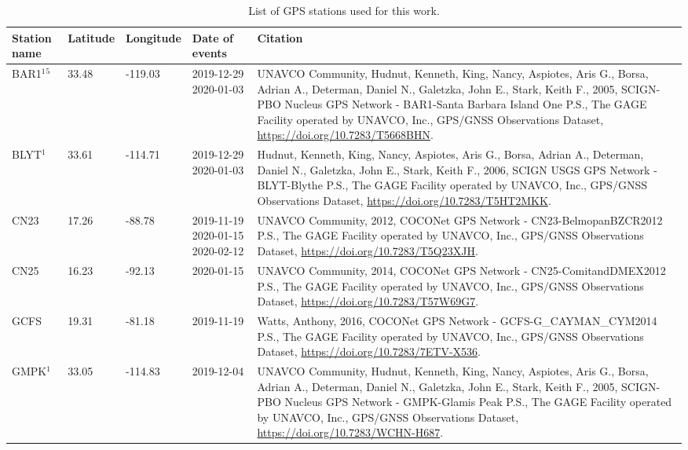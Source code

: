 \clearpage
\onecolumn
\begin{landscape}
  \begin{longtable}{lllp{4cm}p{10cm}}
      \caption{List of GPS stations used for this work.}
      \label{tab:table-stations}
      \endfirsthead
      \endhead
    \hline
    Station name & Latitude & Longitude & Date of events  & Citation \\\hline
    BAR1\hyperlink{Hudnut}{${}^1$}\hyperlink{Hudnut2}{${}^5$}& 33.48 & -119.03 & 2019-12-29 2020-01-03 & UNAVCO Community, Hudnut, Kenneth, King, Nancy, Aspiotes, Aris G., Borsa, Adrian A., Determan, Daniel N., Galetzka, John E., Stark, Keith F., 2005, SCIGN-PBO Nucleus GPS Network - BAR1-Santa Barbara Island One P.S., The GAGE Facility operated by UNAVCO, Inc., GPS/GNSS Observations Dataset, \url{https://doi.org/10.7283/T5668BHN}.\\
    BLYT\hyperlink{Hudnut}{${}^1$} & 33.61 & -114.71 & 2019-12-29 2020-01-03 & Hudnut, Kenneth, King, Nancy, Aspiotes, Aris G., Borsa, Adrian A., Determan, Daniel N., Galetzka, John E., Stark, Keith F., 2006, SCIGN USGS GPS Network - BLYT-Blythe P.S., The GAGE Facility operated by UNAVCO, Inc., GPS/GNSS Observations Dataset, \url{https://doi.org/10.7283/T5HT2MKK}.\\
    CN23 & 17.26 & -88.78 & 2019-11-19 2020-01-15 2020-02-12& UNAVCO Community, 2012, COCONet GPS Network - CN23-BelmopanBZCR2012 P.S., The GAGE Facility operated by UNAVCO, Inc., GPS/GNSS Observations Dataset, \url{https://doi.org/10.7283/T5Q23XJH}.\\
    CN25 & 16.23 & -92.13 & 2020-01-15 & UNAVCO Community, 2014, COCONet GPS Network - CN25-ComitandDMEX2012 P.S., The GAGE Facility operated by UNAVCO, Inc., GPS/GNSS Observations Dataset, \url{https://doi.org/10.7283/T57W69G7}.\\
    GCFS & 19.31 & -81.18 & 2019-11-19& Watts, Anthony, 2016, COCONet GPS Network - GCFS-G\_CAYMAN\_CYM2014 P.S., The GAGE Facility operated by UNAVCO, Inc., GPS/GNSS Observations Dataset, \url{https://doi.org/10.7283/7ETV-X536}.\\
    GMPK\hyperlink{Hudnut}{${}^1$} & 33.05 & -114.83 & 2019-12-04 & UNAVCO Community, Hudnut, Kenneth, King, Nancy, Aspiotes, Aris G., Borsa, Adrian A., Determan, Daniel N., Galetzka, John E., Stark, Keith F., 2005, SCIGN-PBO Nucleus GPS Network - GMPK-Glamis Peak P.S., The GAGE Facility operated by UNAVCO, Inc., GPS/GNSS Observations Dataset, \url{https://doi.org/10.7283/WCHN-H687}.\\

\end{longtable}
\end{landscape}
